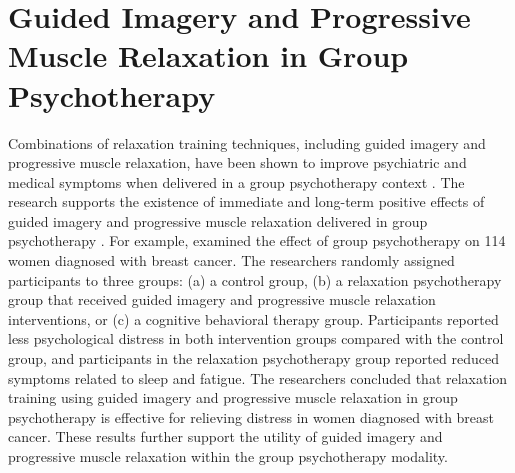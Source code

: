 \section*{Guided Imagery and Progressive Muscle Relaxation in Group Psychotherapy}

Combinations of relaxation training techniques, including guided imagery and progressive muscle relaxation, have been shown to improve psychiatric and medical symptoms when delivered in a group psychotherapy context \citep{bottomley1996group, cunningham1989randomized}. The research supports the existence of immediate and long-term positive effects of guided imagery and progressive muscle relaxation delivered in group psychotherapy \citep{baider1994progressive}. For example, \citet{cohen2007comparing} examined the effect of group psychotherapy on 114 women diagnosed with breast cancer. The researchers randomly assigned participants to three groups: (a) a control group, (b) a relaxation psychotherapy group that received guided imagery and progressive muscle relaxation interventions, or (c) a cognitive behavioral therapy group. Participants reported less psychological distress in both intervention groups compared with the control group, and participants in the relaxation psychotherapy group reported reduced symptoms related to sleep and fatigue. The researchers concluded that relaxation training using guided imagery and progressive muscle relaxation in group psychotherapy is effective for relieving distress in women diagnosed with breast cancer. These results further support the utility of guided imagery and progressive muscle relaxation within the group psychotherapy modality.
